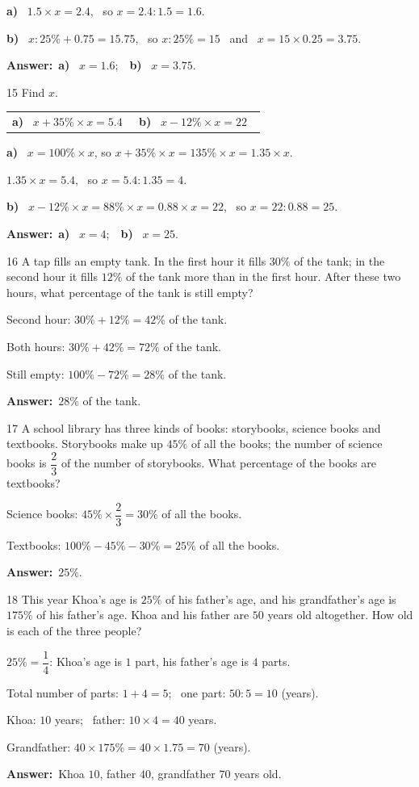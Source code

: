 \documentclass[11pt]{article}
\makeatletter
\newif\ifsol \solfalse
\renewcommand{\arraystretch}{1.35}
\providecommand{\AnsWord}{Đáp số}
\newcommand{\dapso}[1]{\par\textbf{\AnsWord:}\ #1}
\newcommand{\probsol}[1]{%
  \begin{lrbox}{\solmeasure}\begin{minipage}{\dimexpr\linewidth-24pt\relax}#1\end{minipage}\end{lrbox}%
  \ifsol
    \begin{solbox}#1\end{solbox}%
  \else
    \setlength{\solht}{\dimexpr\ht\solmeasure+\dp\solmeasure+0.85cm\relax}%
    \ifdim\solht<1.35cm\setlength{\solht}{1.35cm}\fi
    \begin{tcolorbox}[colback=white,colframe=Line,boxrule=0.8pt,arc=5pt,
      left=8pt,right=8pt,top=4pt,bottom=4pt,height=\solht]{\footnotesize\color{Slate}\itshape\WorkWord}\end{tcolorbox}%
  \fi}
\newcommand{\pa}[1]{\textbf{#1)}\ }
\newenvironment{cols2}{\par\vspace{3pt}\noindent\setlength{\tabcolsep}{0pt}\renewcommand{\arraystretch}{1.3}%
  \begin{tabular}{@{}>{\raggedright\arraybackslash\rule{0pt}{4.4ex}}p{0.48\linewidth}<{\rule[-2.3ex]{0pt}{0pt}}@{\hspace{0.03\linewidth}}>{\raggedright\arraybackslash\rule{0pt}{4.4ex}}p{0.48\linewidth}<{\rule[-2.3ex]{0pt}{0pt}}@{}}}%
  {\end{tabular}\par}
\newcommand{\gap}{\vspace{0.3cm}}
\def\WorkWord{Your work:}
\def\AnsWord{Answer}
\makeatother
\begin{document}
\probsol{
\pa{a} $1.5\times x=2.4$, \ so $x=2.4:1.5=1.6$.\par
\pa{b} $x:25\%+0.75=15.75$, \ so $x:25\%=15$ \ and \ $x=15\times0.25=3.75$.
\dapso{\pa{a} $x=1.6$;\ \ \pa{b} $x=3.75$.}}
\gap
\begin{probbox}{15}{\relax}
Find $x$.
\begin{cols2}
\pa{a} $x+35\%\times x=5.4$ & \pa{b} $x-12\%\times x=22$
\end{cols2}
\end{probbox}
\probsol{
\pa{a} $x=100\%\times x$, so $x+35\%\times x=135\%\times x=1.35\times x$.\par
$1.35\times x=5.4$, \ so $x=5.4:1.35=4$.\par
\pa{b} $x-12\%\times x=88\%\times x=0.88\times x=22$, \ so $x=22:0.88=25$.
\dapso{\pa{a} $x=4$;\ \ \pa{b} $x=25$.}}
\gap
\begin{probbox}{16}{\relax}
A tap fills an empty tank. In the first hour it fills $30\%$ of the tank; in the second hour it fills $12\%$ of the tank more than in the first hour. After these two hours, what percentage of the tank is still empty?
\end{probbox}
\probsol{
Second hour: $30\%+12\%=42\%$ of the tank.\par
Both hours: $30\%+42\%=72\%$ of the tank.\par
Still empty: $100\%-72\%=28\%$ of the tank.
\dapso{$28\%$ of the tank.}}
\gap
\begin{probbox}{17}{\relax}
A school library has three kinds of books: storybooks, science books and textbooks. Storybooks make up $45\%$ of all the books; the number of science books is $\dfrac23$ of the number of storybooks. What percentage of the books are textbooks?
\end{probbox}
\probsol{
Science books: $45\%\times\dfrac23=30\%$ of all the books.\par
Textbooks: $100\%-45\%-30\%=25\%$ of all the books.
\dapso{$25\%$.}}
\gap
\begin{probbox}{18}{\relax}
This year Khoa's age is $25\%$ of his father's age, and his grandfather's age is $175\%$ of his father's age. Khoa and his father are $50$ years old altogether. How old is each of the three people?
\end{probbox}
\probsol{
$25\%=\dfrac14$: Khoa's age is $1$ part, his father's age is $4$ parts.\par
Total number of parts: $1+4=5$; \ one part: $50:5=10$ (years).\par
Khoa: $10$ years; \ father: $10\times4=40$ years.\par
Grandfather: $40\times175\%=40\times1.75=70$ (years).
\dapso{Khoa $10$, father $40$, grandfather $70$ years old.}}
\end{document}
